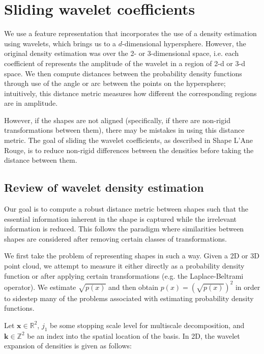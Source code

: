 \documentclass[../tech_report_1.tex]{subfiles}
\begin{document}
\section*{Sliding wavelet coefficients}

We use a feature representation that incorporates the use of a density estimation using wavelets, which brings us to a $d$-dimensional hypersphere. However, the original density estimation was over the 2- or 3-dimensional space, i.e. each coefficient of represents the amplitude of the wavelet in a region of 2-d or 3-d space. We then compute distances between the probability density functions through use of the angle or arc between the points on the hypersphere; intuitively, this distance metric measures how different the corresponding regions are in amplitude.

However, if the shapes are not aligned (specifically, if there are non-rigid transformations between them), there may be mistakes in using this distance metric. The goal of sliding the wavelet coefficients, as described in Shape L'Ane Rouge\cite{peter2008shape}, is to reduce non-rigid differences between the densities before taking the distance between them.

\subsection*{Review of wavelet density estimation}

Our goal is to compute a robust distance metric between shapes such that the essential information inherent in the shape is captured while the irrelevant information is reduced. This follows the paradigm where similarities between shapes are considered after removing certain classes of transformations\cite{peter2008shape,klein1893comparative}.

We first take the problem of representing shapes in such a way. Given a 2D or 3D point cloud, we attempt to measure it either directly as a probability density function or after applying certain transformations (e.g. the Laplace-Beltrami operator). We estimate $\sqrt{p(x)}$ and then obtain $p(x) = (\sqrt{p(x)})^2$ in order to sidestep many of the problems associated with estimating probability density functions. 

Let $\bm{x} \in \mathbb{R}^2$, $j_1$ be some stopping scale level for multiscale decomposition, and $\bm{k} \in \mathbb{Z}^2$ be an index into the spatial location of the basis. In 2D, the wavelet expansion of densities is given as follows: 
\end{document}
